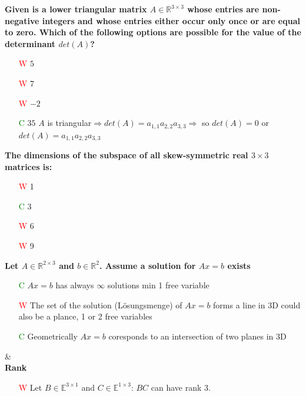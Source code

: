 \documentclass[7pt,landscape, margin = 0.1mm]{article}
\begin{document}
\begin{multicols}{4}
\begin{flushleft}
\begin{itemize}
\end{itemize}
\hspace{3mm}

\textbf{Given is a lower triangular matrix $A  \in \mathbb{R}^{3 \times 3} $ whose entries are non-negative integers and whose
entries either occur only once or are equal to zero. Which of the following options are possible for the
value of the determinant $det(A)$? }
\begin{itemize}
\item[\textcolor{red}{W}]$ 5$
\item[\textcolor{red}{W}]  $7$
\item[\textcolor{red}{W}] $ -2$
\item[\textcolor{green}{C}]  $35$
\textcolor{Emerald}{ $A$ is triangular$\Rightarrow det(A)= a_{1,1}a_{2,2} a_{3,3} \Rightarrow $ so  $det(A) = 0$ or $det(A)= a_{1,1}a_{2,2} a_{3,3}  $} 
\end{itemize}
\hspace{3mm}
\textbf{The dimensions of the subspace of all skew-symmetric real $3 \times 3 $ matrices is:}
\begin{itemize}
\item[\textcolor{red}{W}] 1
\item[\textcolor{green}{C}] 3
\item[\textcolor{red}{W}] 6 
\item[\textcolor{red}{W}] 9
\textcolor{Emerald}{}
\end{itemize}
\hspace{3mm}
\textbf{Let $A  \in \mathbb{R}^{2 \times 3} $ and $b  \in \mathbb{R}^2$. Assume a solution for $Ax=b $ exists}
\begin{itemize}
\item[\textcolor{green}{C}] $Ax =  b $ has always $\infty $ solutions
\textcolor{Emerald}{min 1 free variable}
\item[\textcolor{red}{W}] The set of the solution (Lösungsmenge) of $Ax=b$ forms a line in 3D
\textcolor{Emerald}{could also be a plance, 1 or 2 free variables}
\item[\textcolor{green}{C}] Geometrically $Ax=b$ coresponds to an intersection of two planes in 3D

\end{itemize}

\hspace{0.5mm}
\hline & \\[3mm]
\scriptsize
\textbf{Rank}
\tiny \\
\begin{itemize}
\item[\textcolor{red}{W}] Let $B \in \mathbb{E}^{3 \times 1}$ and $C \in \mathbb{E}^{1 \times 3}$: $BC$ can have rank $3$.


\end{itemize}
\end{flushleft}
\end{multicols}
\end{document}
